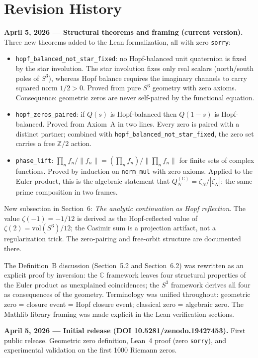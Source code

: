 \documentclass[12pt,a4paper]{article}
\theoremstyle{definition}
\theoremstyle{remark}
\begin{document}
\section*{Revision History}

\textbf{April 5, 2026 --- Structural theorems and framing (current version).}
Three new theorems added to the Lean formalization, all with zero
\texttt{sorry}:
\begin{itemize}
  \item \texttt{hopf\_balanced\_not\_star\_fixed}: no Hopf-balanced unit
    quaternion is fixed by the star involution. The star involution fixes
    only real scalars (north/south poles of $S^3$), whereas Hopf balance
    requires the imaginary channels to carry squared norm $1/2 > 0$. Proved
    from pure $S^3$ geometry with zero axioms. Consequence: geometric zeros
    are never self-paired by the functional equation.
  \item \texttt{hopf\_zeros\_paired}: if $Q(s)$ is Hopf-balanced then
    $Q(1{-}s)$ is Hopf-balanced. Proved from Axiom~A in two lines. Every
    zero is paired with a distinct partner; combined with
    \texttt{hopf\_balanced\_not\_star\_fixed}, the zero set carries a free
    $\mathbb{Z}/2$ action.
  \item \texttt{phase\_lift}: $\prod_n f_n/\|f_n\| = (\prod_n f_n)/\|\prod_n f_n\|$
    for finite sets of complex functions. Proved by induction on
    \texttt{norm\_mul} with zero axioms. Applied to the Euler product, this
    is the algebraic statement that $Q_N^{(\mathbb{C})} = \zeta_N/|\zeta_N|$:
    the same prime composition in two frames.
\end{itemize}
New subsection in Section~6: \emph{The analytic continuation as Hopf
reflection}. The value $\zeta(-1) = -1/12$ is derived as the Hopf-reflected
value of $\zeta(2) = \mathrm{vol}(S^3)/12$; the Casimir sum is a projection
artifact, not a regularization trick. The zero-pairing and free-orbit
structure are documented there.

The Definition~B discussion (Section~5.2 and Section~6.2) was rewritten as
an explicit proof by inversion: the $\mathbb{C}$ framework leaves four
structural properties of the Euler product as unexplained coincidences; the
$S^3$ framework derives all four as consequences of the geometry. Terminology
was unified throughout: geometric zero = closure event = Hopf closure event;
classical zero = algebraic zero. The Mathlib library framing was made explicit
in the Lean verification sections.

\medskip
\textbf{April 5, 2026 --- Initial release (DOI 10.5281/zenodo.19427453).}
First public release. Geometric zero definition, Lean~4 proof (zero
\texttt{sorry}), and experimental validation on the first 1000 Riemann zeros.
\end{document}
